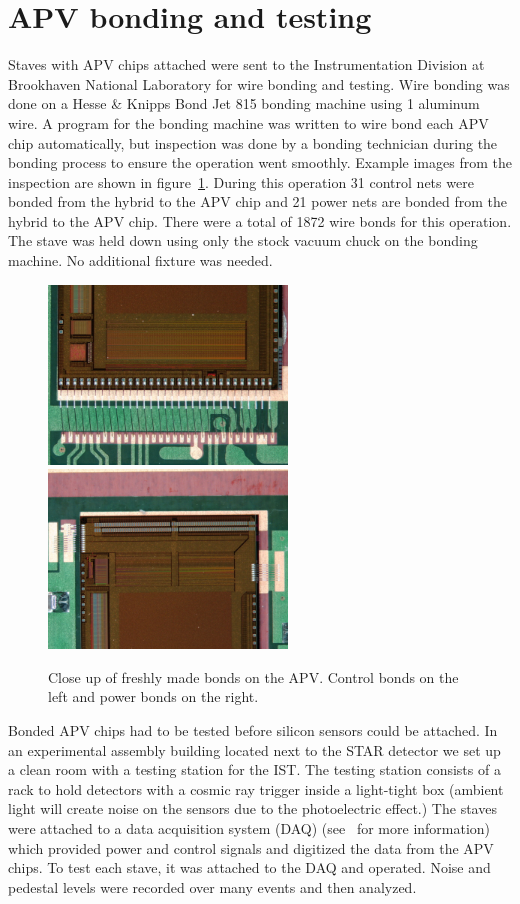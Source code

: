 \documentclass[1p,12pt]{elsarticle}
\begin{document}
\section{APV bonding and testing}
Staves with APV chips attached were sent to the Instrumentation Division at
Brookhaven National Laboratory for wire bonding and testing. Wire bonding was
done on a Hesse \& Knipps Bond Jet 815 bonding machine using \SI{1}{\mil} aluminum
wire. A program for the bonding machine was written to wire bond each APV chip
automatically, but inspection was done by a bonding technician during the
bonding process to ensure the operation went smoothly.  Example images from the
inspection are shown in figure~\ref{fig:apv_bond}. During this
operation 31 control nets were bonded from the hybrid to the APV chip and 21
power nets are bonded from the hybrid to the APV chip. There were a total of 1872
wire bonds for this operation. The stave was held down using only the stock
vacuum chuck on the bonding machine. No additional fixture was needed.

\begin{figure}[h]
\begin{center}
\includegraphics[width=2.5in, keepaspectratio=true, angle=0]{graphics/control.jpg}
\includegraphics[width=2.5in, keepaspectratio=true, angle=0]{graphics/power.jpg}
\caption{Close up of freshly made bonds on the APV.  Control bonds on the left
and power bonds on the right.
\label{fig:apv_bond}}
\end{center}
\end{figure}
%
Bonded APV chips had to be tested before silicon sensors could be attached. In an
experimental assembly building located next to the STAR detector we set up a
clean room with a testing station for the IST. The testing station consists of
a rack to hold detectors with a cosmic ray trigger inside a light-tight box
(ambient light will create noise on the sensors due to the photoelectric effect.)
The staves were attached to a data acquisition system (DAQ) (see~\cite{ref:daq} for more information)
which provided power and control signals and digitized the data from the APV
chips. To test each stave, it was attached to the DAQ and operated. Noise and pedestal levels
were recorded over many events and then analyzed.
\end{document}
